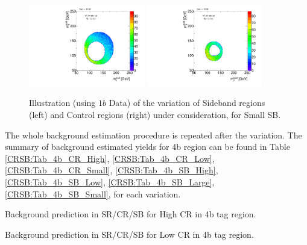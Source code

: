 \begin{figure}[htbp!]
\begin{center}
\includegraphics[width=0.45\textwidth,angle=-90]{figures/boosted/Syst_CRSB/SB_Small_Sideband_OneTag_mH0H1.pdf}
\includegraphics[width=0.45\textwidth,angle=-90]{figures/boosted/Syst_CRSB/SB_Small_Control_OneTag_mH0H1.pdf}\\
\end{center}
\caption{Illustration (using $1b$ Data) of the variation of Sideband regions (left) and Control regions (right) under consideration, for Small SB.}
\label{CRSB:SB_Small}
\end{figure}

\clearpage
The whole background estimation procedure is repeated after the variation. The summary of background estimated yields for 4b region can be found in Table \ref{CRSB:Tab_4b_CR_High}, \ref{CRSB:Tab_4b_CR_Low}, \ref{CRSB:Tab_4b_CR_Small}, \ref{CRSB:Tab_4b_SB_High}, \ref{CRSB:Tab_4b_SB_Low}, \ref{CRSB:Tab_4b_SB_Large},  \ref{CRSB:Tab_4b_SB_Small}, for each variation. 
\begin{table}[htbp!]
\begin{center}

\end{center}
\caption{Background prediction in SR/CR/SB for High CR in 4b tag region.}
\label{CRSB:Tab_4b_CR_High}
\end{table}

\begin{table}[htbp!]
\begin{center}

\end{center}
\caption{Background prediction in SR/CR/SB for Low CR in 4b tag region.}
\label{CRSB:Tab_4b_CR_Low}
\end{table}

